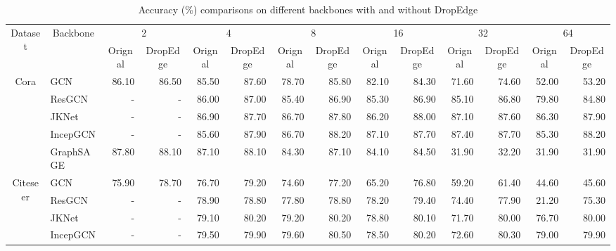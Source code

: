 \documentclass{article}
\begin{document}
\begin{landscape}
    \vspace*{\fill}
\begin{table}[htbp]
  \centering
  \caption{Accuracy (\%) comparisons on different backbones with and without DropEdge}
    \vspace{-1ex}
    \small
    \begin{tabular}{cl|rr|rr|rr|rr|rr|rr}
    \hline
    \multirow{2}[4]{*}{Dataset} & \multicolumn{1}{c|}{\multirow{2}[4]{*}{Backbone}} & \multicolumn{2}{c|}{2} & \multicolumn{2}{c|}{4} & \multicolumn{2}{c|}{8} & \multicolumn{2}{c|}{16} & \multicolumn{2}{c|}{32} & \multicolumn{2}{c}{64} \\
\cline{3-14}          &       & \multicolumn{1}{c}{Orignal} & \multicolumn{1}{c|}{DropEdge} & \multicolumn{1}{c}{Orignal} & \multicolumn{1}{c|}{DropEdge} & \multicolumn{1}{c}{Orignal} & \multicolumn{1}{c|}{DropEdge} & \multicolumn{1}{c}{Orignal} & \multicolumn{1}{c|}{DropEdge} & \multicolumn{1}{c}{Orignal} & \multicolumn{1}{c|}{DropEdge} & \multicolumn{1}{c}{Orignal} & \multicolumn{1}{c}{DropEdge} \\
    \hline
    \multirow{5}[2]{*}{Cora} & GCN   & 86.10 & 86.50 & 85.50 & 87.60 & 78.70 & 85.80 & 82.10 & 84.30 & 71.60 & 74.60 & 52.00 & 53.20 \\
          & ResGCN & -     & -     & 86.00 & 87.00 & 85.40 & 86.90 & 85.30 & 86.90 & 85.10 & 86.80 & 79.80 & 84.80 \\
          & JKNet & -     & -     & 86.90 & 87.70 & 86.70 & 87.80 & 86.20 & 88.00 & 87.10 & 87.60 & 86.30 & 87.90 \\
          & IncepGCN & -     & -     & 85.60 & 87.90 & 86.70 & 88.20 & 87.10 & 87.70 & 87.40 & 87.70 & 85.30 & 88.20 \\
          & GraphSAGE & 87.80 & 88.10 & 87.10 & 88.10 & 84.30 & 87.10 & 84.10 & 84.50 & 31.90 & 32.20 & 31.90 & 31.90 \\
    \hline
    \multirow{5}[2]{*}{Citeseer} & GCN   & 75.90 & 78.70 & 76.70 & 79.20 & 74.60 & 77.20 & 65.20 & 76.80 & 59.20 & 61.40 & 44.60 & 45.60 \\
          & ResGCN & -     & -     & 78.90 & 78.80 & 77.80 & 78.80 & 78.20 & 79.40 & 74.40 & 77.90 & 21.20 & 75.30 \\
          & JKNet & -     & -     & 79.10 & 80.20 & 79.20 & 80.20 & 78.80 & 80.10 & 71.70 & 80.00 & 76.70 & 80.00 \\
          & IncepGCN & -     & -     & 79.50 & 79.90 & 79.60 & 80.50 & 78.50 & 80.20 & 72.60 & 80.30 & 79.00 & 79.90 \\

\end{tabular}
\end{table}
\end{landscape}
\end{document}

